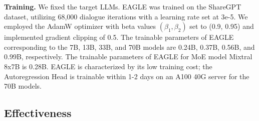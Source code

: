 \documentclass{article}
\theoremstyle{plain}
\theoremstyle{definition}
\theoremstyle{remark}
\begin{document}
\textbf{Training.}
We fixed the target LLMs. EAGLE was trained on the ShareGPT dataset, utilizing 68,000 dialogue iterations with a learning rate set at 3e-5. We employed the AdamW optimizer with beta values $(\beta_1, \beta_2)$ set to (0.9, 0.95) and implemented gradient clipping of 0.5. 
The trainable parameters of EAGLE corresponding to the 7B, 13B, 33B, and 70B models are 0.24B, 0.37B, 0.56B, and 0.99B, respectively. The trainable parameters of EAGLE for MoE model Mixtral 8x7B is 0.28B. EAGLE is characterized by its low training cost; the Autoregression Head is trainable within 1-2 days on an A100 40G server for the 70B models.



\subsection{Effectiveness}


\end{document}
